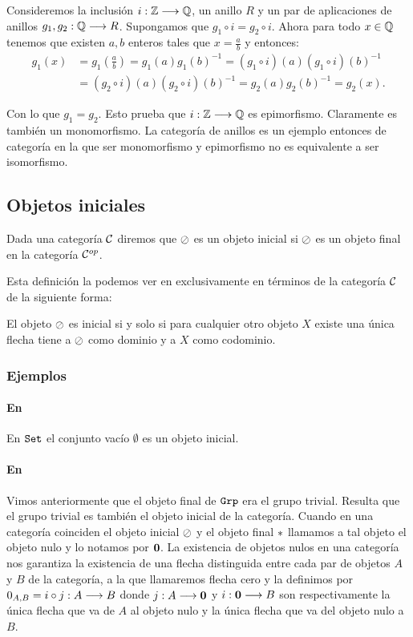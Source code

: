 Consideremos la inclusión
$i : \mathbb{Z}\longrightarrow \mathbb{Q}$, un anillo $R$
y un par de aplicaciones de anillos $g_1, g_2 : \mathbb{Q}\longrightarrow R$. Supongamos
que $g_1 \circ i = g_2 \circ i$. Ahora para todo $x \in \mathbb{Q}$
tenemos que existen $a, b$ enteros tales que $x = \frac{a}{b}$ y entonces:
\begin{align*}
g_1(x) & = g_1(\frac{a}{b}) = g_1(a)g_1(b)^{-1}
       = (g_1 \circ i)(a)(g_1\circ i)(b)^{-1} \\
       & = (g_2\circ i)(a)(g_2\circ i)(b)^{-1}
       = g_2(a)g_2(b)^{-1} = g_2(x).
\end{align*}

Con lo que $g_1=g_2$. Esto prueba que $i : \mathbb{Z}\longrightarrow \mathbb{Q}$ es epimorfismo.
Claramente es también un monomorfismo. La categoría de anillos es
un ejemplo entonces de categoría en la que ser monomorfismo y
epimorfismo no es equivalente a ser isomorfismo.

\subsection{Objetos iniciales}
\begin{definition}
Dada una categoría $\mathcal{C}$ diremos que $\oslash$ es un objeto
inicial si $\oslash$ es un objeto final en la categoría
$\mathcal{C}^{op}$.
\end{definition}

Esta definición la podemos ver en exclusivamente en términos
de la categoría $\mathcal{C}$ de la siguiente forma:
\begin{proposition}
El objeto $\oslash$ es inicial si y solo si para cualquier otro objeto
$X$ existe una única flecha tiene a $\oslash$ como dominio y a $X$ como
codominio.
\end{proposition}

\subsubsection{Ejemplos}
\paragraph{En \Set}
En $\texttt{Set}$ el conjunto vacío $\emptyset$ es un objeto inicial.

\paragraph{En \Grp}
Vimos anteriormente que el objeto final de $\texttt{Grp}$ era el grupo
trivial. Resulta que el grupo trivial es también el objeto inicial
de la categoría. Cuando en una categoría coinciden el objeto inicial
$\oslash$ y el objeto final $*$ llamamos a tal objeto el objeto
nulo y lo notamos por $\textbf{0}$. La existencia de objetos nulos en una categoría nos garantiza
la existencia de una flecha distinguida entre cada par de objetos
$A$ y $B$ de la categoría, a la que llamaremos
flecha cero y la definimos por
$0_{A,B} = i \circ j : A\longrightarrow B$ donde
$j: A\longrightarrow \textbf{0}$ y $i : \textbf{0}\longrightarrow B$
son respectivamente la única flecha que va de $A$ al objeto nulo y
la única flecha que va del objeto nulo a $B$.


